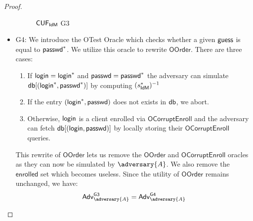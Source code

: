 \begin{proof}
\begin{itemize}
\begin{figure*}
{{\begin{pchstack}[center, space=0.2cm, boxed]
\begin{pcvstack}
    \end{pcvstack}
    \begin{pcvstack}
    \end{pcvstack}
    \end{pchstack}
}}
\caption{$\mathsf{CUF}_{\textsf{IdM}}$ \textsf{G3}}
\label{game:cuf_idmg3}
\end{figure*}
        \item \textsf{G4}: We introduce the \textsf{OTest} Oracle which checks whether a given $\mathsf{guess}$ is equal to $\textsf{passwd}^*$. We utilize this oracle to rewrite $\mathsf{OOrder}$. There are three cases:
        \begin{enumerate}
            \item If $\mathsf{login} = 
        \mathsf{login}^*$ and $\textsf{passwd} = \textsf{passwd}^*$ the adversary can simulate $\mathsf{db}[(\mathsf{login}^*, \textsf{passwd}^*)]$ by computing $(s_{\textsf{IdM}}^*)^{-1}$ 
            \item If the entry $(\mathsf{login}^*, \textsf{passwd})$ does not exists in $\mathsf{db}$, we abort.
            \item Otherwise, $\mathsf{login}$ is a client enrolled via $\mathsf{OCorruptEnroll}$ and the adversary can fetch $\mathsf{db}[(\mathsf{login}, \textsf{passwd})]$ by locally storing their $\mathsf{OCorruptEnroll}$ queries.
        \end{enumerate} 
        This rewrite of $\mathsf{OOrder}$ lets us remove the $\mathsf{OOrder}$ and $\mathsf{OCorruptEnroll}$ oracles as they can now be simulated by $\adversary{A}$. We also remove the $\mathsf{enrolled}$ set which becomes useless. Since the utility of $\mathsf{OOrder}$ remains unchanged, we have:
        \begin{align*}
            \advtg_\adversary{A}^{\mathsf{G3}} = \advtg_\adversary{A}^{\mathsf{G4}}\\
        \end{align*}
        


\end{itemize}
\end{proof}
